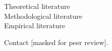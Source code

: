 \faSquareO \vspace{1em} Theoretical literature\\
\faSquareO \vspace{1em} Methodological literature\\
\faSquareO \vspace{1em} Empirical literature



\divider

\divider

\divider

\divider

\divider

\divider

\divider

\divider






Contact [masked for peer review].
